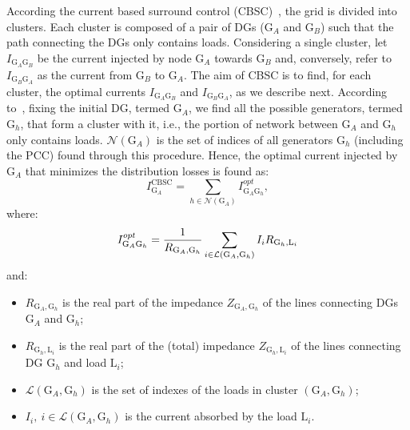 \documentclass[journal]{IEEEtran}
\begin{document}
According the current based surround control (CBSC)~\cite{SurroundControl}, the grid is divided into clusters. Each cluster is composed of a pair of DGs ($\text{G}_A$ and $\text{G}_B$) such that the path connecting the DGs only contains loads. Considering a single cluster, let $I_{\text{G}_A\text{G}_B}$ be the current injected by node $\text{G}_A$ towards $\text{G}_B$ and, conversely, refer to $I_{\text{G}_B\text{G}_A}$ as the current from $\text{G}_B$ to $\text{G}_A$. The aim of CBSC is to find, for each cluster, the optimal currents $I_{\text{G}_A\text{G}_B}$ and $I_{\text{G}_B\text{G}_A}$, as we describe next. According to~\cite{SurroundControl}, fixing the initial DG, termed $\text{G}_A$, we find all the possible generators, termed $\text{G}_h$, that form a cluster with it, i.e., the portion of network between $\text{G}_A$ and $\text{G}_h$ only contains loads. $\mathcal N(\text{G}_A)$ is the set of indices of all generators $\text{G}_h$ (including the PCC) found through this procedure. Hence, the optimal current injected by $\text{G}_A$ that minimizes the distribution losses is found as:
\begin{equation}
I_{\text{G}_A}^{\text{CBSC}} = \sum_{h\in \mathcal N(\text{G}_A)}{I_{\text{G}_A\text{G}_h}^{opt}} \label{eq:CBIAopt} ,
\end{equation}
where:
\begin{equation}
	I_{\text{G}_A\text{G}_h}^{opt}
	= \displaystyle{1\over{R_{\text{G}_A,\text{G}_h}}}\sum_{i\in\mathcal{L}(\text{G}_A,\text{G}_h)}{I_{i}R_{\text{G}_h ,\text{L}_i}} \label{eq:CBIABopt}
\end{equation}
and:
\begin{itemize}
\item $R_{\text{G}_A,\text{G}_h}$ is the real part of the impedance $Z_{\text{G}_A,\text{G}_h}$ of the lines connecting DGs $\text{G}_A$ and $\text{G}_h$;
\item $R_{\text{G}_h,\text{L}_i}$ is the real part of the (total) impedance $Z_{\text{G}_h,\text{L}_i}$ of the lines connecting DG $\text{G}_h$ and load $\text{L}_i$;
\item $\mathcal{L}(\text{G}_A,\text{G}_h)$ is the set of indexes of the loads in cluster $(\text{G}_A,\text{G}_h)$;
\item $I_i,\ i\in \mathcal{L}(\text{G}_A,\text{G}_h)$ is the current absorbed by the load  $\text{L}_i$.
\end{itemize}
\end{document}
